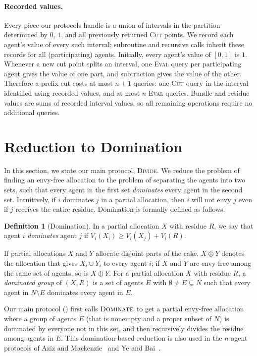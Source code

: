 \documentclass[11pt]{article}
\newcommand{\Dominate}{\textsc{Dominate}}
\theoremstyle{plain}
\theoremstyle{definition}
\newtheorem{definition}{Definition}
\theoremstyle{plain}
\begin{document}
\paragraph{Recorded values.}
Every piece our protocols handle is a union of intervals in the partition determined by $0$, $1$, and all previously returned \textsc{Cut} points. We record each agent's value of every such interval; subroutine and recursive calls inherit these records for all (participating) agents. Initially, every agent's value of $[0,1]$ is $1$. Whenever a new cut point splits an interval, one \textsc{Eval} query per participating agent gives the value of one part, and subtraction gives the value of the other. Therefore a prefix cut costs at most $n+1$ queries: one \textsc{Cut} query in the interval identified using recorded values, and at most $n$ \textsc{Eval} queries. Bundle and residue values are sums of recorded interval values, so all remaining operations require no additional queries.


\section{Reduction to Domination}\label{sec: reduce to domination}

In this section, we state our main protocol, \textsc{Divide}. We reduce the problem of finding an envy-free allocation to the problem of separating the agents into two sets, such that every agent in the first set \emph{dominates} every agent in the second set. Intuitively, if $i$ dominates $j$ in a partial allocation, then $i$ will not envy $j$ even if $j$ receives the entire residue.
Domination is formally defined as follows.

\begin{definition}[Domination]
In a partial allocation $X$ with residue $R$, we say that agent $i$ \emph{dominates} agent $j$ if $V_i(X_i) \geq V_i(X_j) + V_i(R)$.
\end{definition}

If partial allocations $X$ and $Y$ allocate disjoint parts of the cake, $X\oplus Y$ denotes the allocation that gives $X_i\cup Y_i$ to every agent $i$; if $X$ and $Y$ are envy-free among the same set of agents, so is $X\oplus Y$. For a partial allocation $X$ with residue $R$, a \emph{dominated group} of $(X,R)$ is a set of agents $E$ with $\emptyset\neq E\subsetneq N$ such that every agent in $N\setminus E$ dominates every agent in $E$.


Our main protocol () first calls $\Dominate$ to get a partial envy-free allocation where a group of agents $E$ (that is nonempty and a proper subset of $N$) is dominated by everyone not in this set, and then recursively divides the residue among agents in $E$.  This domination-based reduction is also used in the $n$-agent protocols of Aziz and Mackenzie~\cite{aziz2016discrete} and Ye and Bai~\cite{ye2026cutting}.
\end{document}
